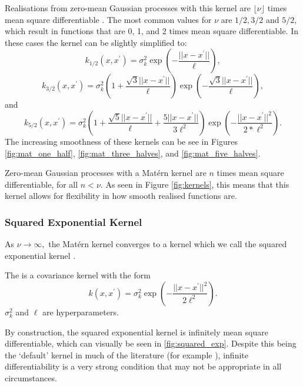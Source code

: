 Realisations from zero-mean Gaussian processes with this kernel are
$\lfloor\nu\rfloor$ times mean square differentiable
\parencite{rasmussen_gaussian_2008}.
The most common values for $\nu$ are $1/2, 3/2$ and $5/2,$ which result in
functions that are 0, 1, and 2 times mean square differentiable. In these cases
the kernel can be slightly simplified to:
$$
    k_{1/2}(x, x^\prime)
    = \sigma^2_k\exp\left(-\frac{||x - x^\prime||}{\ell}\right),
$$
$$
    k_{3/2}(x, x^\prime)
    = \sigma^2_k
    \left(1 + \frac{\sqrt{3}||x - x^\prime||}{\ell}\right)
    \exp\left(-\frac{\sqrt{3}||x - x^\prime||}{\ell}\right),
$$
and
$$
    k_{5/2}(x, x^\prime)
    = \sigma^2_k
    \left(
    1 + \frac{\sqrt{5}||x - x^\prime||}{\ell} + \frac{5||x - x^\prime||}{3\ell^2}
    \right)
    \exp\left(-\frac{||x - x^\prime||^2}{2*\ell^2}\right).
$$
The increasing smoothness of these kernels can be see in Figures
\ref{fig:mat_one_half}, \ref{fig:mat_three_halves},
and \ref{fig:mat_five_halves}.

Zero-mean Gaussian processes with a Mat\'ern kernel are $n$ times mean square
differentiable, for all $n < \nu.$ As seen in Figure \ref{fig:kernels}, this
means that this kernel allows for flexibility in how smooth realised functions
are.

\subsubsection*{Squared Exponential Kernel}

As $\nu\to\infty,$ the Mat\'ern kernel converges to a kernel which we call
the squared exponential
kernel \parencite[85]{rasmussen_gaussian_2008}.

\begin{definition}
    The  is a covariance kernel with the form
    $$
        k(x, x^\prime)
        = \sigma^2_k\exp\left(-\frac{||x - x^\prime||^2}{2\ell^2}\right).
    $$ $\sigma^2_k$ and $\ell$ are hyperparameters.
\end{definition}

By construction, the squared exponential kernel is infinitely
mean square differentiable, which can visually be seen in \ref{fig:squared_exp}.
Despite this being the `default' kernel in much of
the literature (for example \cite{gutmann_bayesian_2016}), infinite
differentiability is a very strong condition that may not be appropriate in
all circumstances.



